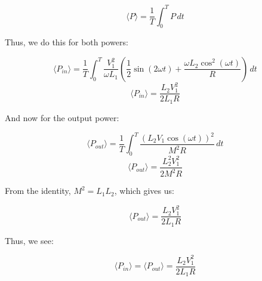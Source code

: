 \begin{enumerate}
\begin{enumerate}
        $$\langle P\rangle=\frac{1}{T}\int_0^T P\,dt$$

        Thus, we do this for both powers:

        $$\langle P_{in}\rangle=\frac{1}{T}\int_0^T \frac{V_1^2}{\omega L_1}\left(\frac{1}{2}\sin(2\omega t) +\frac{\omega L_2\cos^2(\omega t)}{R}\right)\,dt$$
        $$\langle P_{in}\rangle=\frac{L_2V_1^2}{2L_1 R}$$

        And now for the output power:

        $$\langle P_{out}\rangle=\frac{1}{T}\int_0^T \frac{(L_2V_1\cos(\omega t))^2}{M^2R}\,dt$$
        $$\langle P_{out}\rangle=\frac{L_2^2V_1^2}{2M^2R}$$

        From the identity, $M^2=L_1L_2$, which gives us:

        $$\langle P_{out}\rangle=\frac{L_2V_1^2}{2L_1R}$$

        Thus, we see:

        $$\boxed{\langle P_{in}\rangle=\langle P_{out}\rangle=\frac{L_2V_1^2}{2L_1R}}$$

    \end{enumerate}

\end{enumerate}



